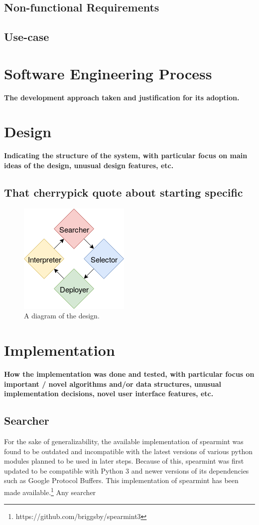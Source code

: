 \documentclass{article}
\begin{document}
\subsection{Non-functional Requirements}
\subsection{Use-case}
\section{Software Engineering Process}
\textbf{The development approach taken and justification for its
adoption.}
\section{Design}
\textbf{Indicating the structure of the system, with particular
focus on main ideas of the design, unusual design
features, etc. \\}
\subsection{That cherrypick quote about starting specific}
\begin{figure}[!ht]
  \caption{A diagram of the design.}
  \centering
   \includegraphics[scale=0.8]{Design}
\end{figure}
\section{Implementation}
\textbf{How the implementation was done and tested, with
particular focus on important / novel algorithms and/or
data structures, unusual implementation decisions, novel
user interface features, etc.}
\subsection{Searcher}
For the sake of generalizability, the available implementation of spearmint was found to be outdated and incompatible with the latest versions of various python modules planned to be used in later steps. 
Because of this, spearmint was first updated to be compatible with Python 3 and newer versions of its dependencies such as Google Protocol Buffers. This implementation of spearmint has been made available.\footnote{https://github.com/briggsby/spearmint3}
Any searcher 
\end{document}
